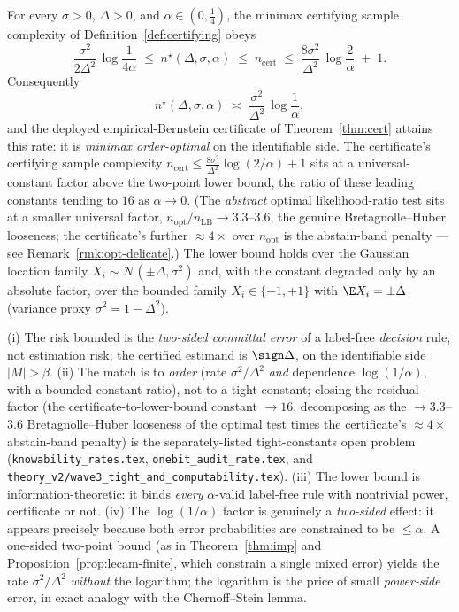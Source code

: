 \begin{theorem}\label{thm:minimax-opt}
For every $\sigma>0$, $\Delta>0$, and $\alpha\in(0,\tfrac14)$, the minimax certifying sample
complexity of Definition~\ref{def:certifying} obeys
\[
   \boxed{\;
   \frac{\sigma^2}{2\Delta^2}\,\log\!\frac{1}{4\alpha}
   \;\le\;
   n^\star(\Delta,\sigma,\alpha)
   \;\le\;
   n_{\mathrm{cert}}\;\le\;
   \frac{8\sigma^2}{\Delta^2}\,\log\!\frac{2}{\alpha}\;+\;1 .
   \;}
\]
Consequently
\[
   n^\star(\Delta,\sigma,\alpha)\;\asymp\;\frac{\sigma^2}{\Delta^2}\,\log\frac1\alpha ,
\]
and the deployed empirical-Bernstein certificate of Theorem~\ref{thm:cert}
attains this rate: it is \emph{minimax order-optimal} on the identifiable side. The certificate's
certifying sample complexity $n_{\mathrm{cert}}\le\tfrac{8\sigma^2}{\Delta^2}\log(2/\alpha)+1$
sits at a universal-constant factor above the two-point lower bound, the ratio of these leading
constants tending to $16$ as $\alpha\to0$. (The \emph{abstract} optimal likelihood-ratio test sits
at a smaller universal factor, $n_{\mathrm{opt}}/n_{\mathrm{LB}}\to3.3$--$3.6$, the genuine
Bretagnolle--Huber looseness; the certificate's further $\approx4\times$ over $n_{\mathrm{opt}}$ is
the abstain-band penalty --- see Remark~\ref{rmk:opt-delicate}.) The lower bound holds
over the Gaussian location family $X_i\sim\mathcal N(\pm\Delta,\sigma^2)$ and, with the
constant degraded only by an absolute factor, over the bounded family
$X_i\in\{-1,+1\}$ with $\E X_i=\pm\Delta$ (variance proxy $\sigma^2=1-\Delta^2$).
\end{theorem}

\begin{remark}\label{rmk:opt-scope}
(i) The risk bounded is the \emph{two-sided committal error} of a label-free \emph{decision}
rule, not estimation risk; the certified estimand is $\sign\Delta$, on the identifiable side
$|M|>\beta$. (ii) The match is to \emph{order} (rate $\sigma^2/\Delta^2$ \emph{and} dependence
$\log(1/\alpha)$, with a bounded constant ratio), not to a tight constant; closing the residual
factor (the certificate-to-lower-bound constant $\to16$, decomposing as the $\to3.3$--$3.6$
Bretagnolle--Huber looseness of the optimal test times the certificate's $\approx4\times$
abstain-band penalty) is the separately-listed tight-constants open problem
(\texttt{knowability\_rates.tex}, \texttt{onebit\_audit\_rate.tex}, and
\texttt{theory\_v2/wave3\_tight\_and\_computability.tex}).
(iii) The lower bound is information-theoretic: it binds \emph{every} $\alpha$-valid label-free
rule with nontrivial power, certificate or not. (iv) The $\log(1/\alpha)$ factor is genuinely a
\emph{two-sided} effect: it appears precisely because both error probabilities are constrained
to be $\le\alpha$. A one-sided two-point bound (as in Theorem~\ref{thm:imp} and
Proposition~\ref{prop:lecam-finite}, which constrain a single mixed error) yields the rate
$\sigma^2/\Delta^2$ \emph{without} the logarithm; the logarithm is the price of small
\emph{power-side} error, in exact analogy with the Chernoff--Stein lemma.
\end{remark}

